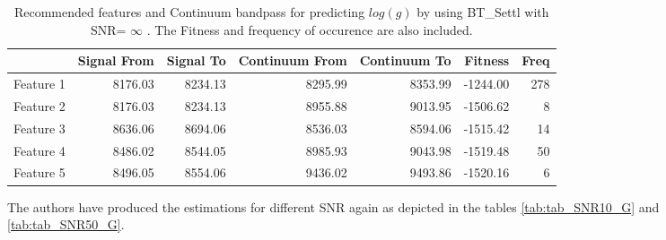 {{{{\begin{table}
\begin{center}
\begin{tabular}{rrrrrrr}
  \hline
 & Signal From & Signal To & Continuum From & Continuum To & Fitness & Freq \\ 
  \hline
Feature 1 & 8176.03 & 8234.13 & 8295.99 & 8353.99 & -1244.00 & 278 \\ 
  Feature 2 & 8176.03 & 8234.13 & 8955.88 & 9013.95 & -1506.62 &   8 \\ 
  Feature 3 & 8636.06 & 8694.06 & 8536.03 & 8594.06 & -1515.42 &  14 \\ 
  Feature 4 & 8486.02 & 8544.05 & 8985.93 & 9043.98 & -1519.48 &  50 \\ 
  Feature 5 & 8496.05 & 8554.06 & 9436.02 & 9493.86 & -1520.16 &   6 \\ 
   \hline
\end{tabular}
\caption {Recommended features and Continuum bandpass for predicting $log(g)$ 
      by using BT\_Settl with SNR= $ \infty $ . 
      The Fitness and frequency of occurence are also included.} \label{tab:tab_SNRoo_G} 
\end{center}
\end{table}

The authors have produced the estimations for different SNR again 
as depicted in the tables \ref{tab:tab_SNR10_G} and \ref{tab:tab_SNR50_G}.

}}}}
